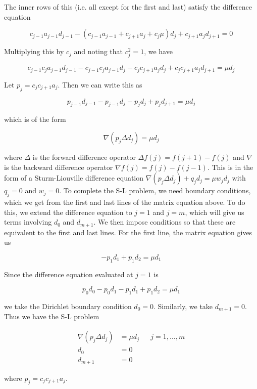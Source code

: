 \documentclass[12pt]{article}
\begin{document}
The inner rows of this (i.e. all except for the first and last) satisfy the difference equation

\[
c_{j-1} a_{j-1} d_{j-1} - (c_{j-1}a_{j-1} + c_{j+1}a_j + c_j \mu) d_j
+ c_{j+1} a_j d_{j+1} = 0
\]

Multiplying this by $c_j$ and noting that $c_j^2 = 1$, we have

\[
c_{j-1} c_j a_{j-1} d_{j-1} - c_{j-1} c_j a_{j-1} d_j - c_j c_{j+1} a_j d_j
+ c_j c_{j+1} a_j d_{j+1} = \mu d_j
\]

Let $p_j = c_j c_{j+1} a_j$. Then we can write this as

\[
p_{j-1} d_{j-1} - p_{j-1} d_j - p_j d_j
+ p_j d_{j+1} = \mu d_j
\]

which is of the form

\[
\nabla( p_j \Delta d_j ) = \mu d_j
\]

where $\Delta$ is the forward difference operator $\Delta f(j) = f(j+1) - f(j)$ and $\nabla$ is the backward difference operator $\nabla f(j) = f(j) - f(j-1)$. This is in the form of a Sturm-Liouville difference equation $\nabla( p_j \Delta d_j ) + q_j d_j = \mu w_j d_j$ with $q_j = 0$ and $w_j = 0$. To complete the S-L problem, we need boundary conditions, which we get from the first and last lines of the matrix equation above. To do this, we extend the difference equation to $j = 1$ and $j = m$, which will give us terms involving $d_0$ and $d_{m+1}$. We then impose conditions so that these are equivalent to the first and last lines. For the first line, the matrix equation gives us

\[
-p_1 d_1 + p_1 d_2 = \mu d_1
\]

Since the difference equation evaluated at $j = 1$ is

\[
p_0 d_0 - p_0 d_1 - p_1 d_1 + p_1 d_2 = \mu d_1
\]

we take the Dirichlet boundary condition $d_0 = 0$. Similarly, we take $d_{m+1} = 0$. Thus we have the S-L problem

\begin{align*}
\nabla( p_j \Delta d_j ) &= \mu d_j && j = 1, \dots, m \\
d_0 &= 0 \\
d_{m+1} &= 0
\end{align*}

where $p_j = c_j c_{j+1} a_j$.
\end{document}
